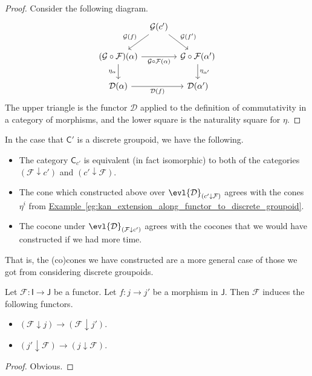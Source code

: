 \documentclass[main.tex]{subfiles}
\begin{document}
\begin{proof}
  Consider the following diagram.
  \begin{equation*}
    \begin{tikzcd}[column sep=tiny]
      & \mathcal{G}(c')
      \arrow[ld, swap, "\mathcal{G}(f)"]
      \arrow[rd, "\mathcal{G}(f')"]
      \\
      (\mathcal{G} \circ \mathcal{F})(\alpha)
      \arrow[rr, swap, "\mathcal{G} \circ \mathcal{F}(\alpha)"]
      \arrow[d, swap, "\eta_{\alpha}"]
      && \mathcal{G} \circ \mathcal{F}(\alpha')
      \arrow[d, "\eta_{\alpha'}"]
      \\
      \mathcal{D}(\alpha)
      \arrow[rr, swap, "\mathcal{D}(f)"]
      &&\mathcal{D}(\alpha')
    \end{tikzcd}
  \end{equation*}
  The upper triangle is the functor $\mathcal{D}$ applied to the definition of commutativity in a category of morphisms, and the lower square is the naturality square for $\eta$.
\end{proof}

\begin{example}
  In the case that $\mathsf{C}'$ is a discrete groupoid, we have the following.

  \begin{itemize}
    \item The category $\mathsf{C}_{c'}$ is equivalent (in fact isomorphic) to both of the categories $(\mathcal{F} \downarrow c')$ and $(c' \downarrow \mathcal{F})$.

    \item The cone which constructed above over $\evl{\mathcal{D}}_{(c' \downarrow \mathcal{F})}$ agrees with the cones $\eta^{i}$ from \hyperref[eg:kan_extension_along_functor_to_discrete_groupoid]{Example~\ref*{eg:kan_extension_along_functor_to_discrete_groupoid}}.

    \item The cocone under $\evl{\mathcal{D}}_{(\mathcal{F} \downarrow c')}$ agrees with the cocones that we would have constructed if we had more time.
  \end{itemize}

  That is, the (co)cones we have constructed are a more general case of those we got from considering discrete groupoids.
\end{example}

\begin{lemma}
  \label{lemma:morphism_induces_functor_between_comma_categories}
  Let $\mathcal{F}\colon \mathsf{I} \to \mathsf{J}$ be a functor. Let $f\colon j \to j'$ be a morphism in $\mathsf{J}$. Then $\mathcal{F}$ induces the following functors.
  \begin{itemize}
    \item $(\mathcal{F} \downarrow j) \to (\mathcal{F} \downarrow j')$.

    \item $(j' \downarrow \mathcal{F}) \to (j \downarrow \mathcal{F})$.
  \end{itemize}
\end{lemma}
\begin{proof}
  Obvious.
\end{proof}
\end{document}
